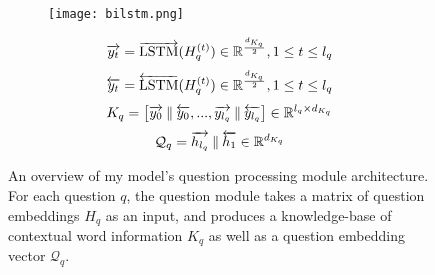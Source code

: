\begin{figure}[htbp]
    \centering
    \begin{subfigure}[l]{0.4\textwidth}
    \texttt{[image: bilstm.png]}
    \end{subfigure}
    \begin{subfigure}[r]{0.59\textwidth}
        \begin{equation}
            \overrightarrow{y_t} = \overrightarrow{\text{LSTM}}(H_q^{(t)}) \in \mathbb{R}^\frac{d_{K_q}}{2}, 1 \leq t \leq l_q\\
            \label{equation:question_module_forward_y_t}
        \end{equation}
        \begin{equation}
            \overleftarrow{y_t} = \overleftarrow{\text{LSTM}}(H_q^{(t)}) \in \mathbb{R}^\frac{d_{K_q}}{2}, 1 \leq t \leq l_q\\
            \label{equation:question_module_backward_y_t}
        \end{equation}
        \begin{equation}
            K_q = \left [ \overrightarrow{y_0} \mathbin\Vert \overleftarrow{y_0}, ..., \overrightarrow{y_{l_q}} \mathbin\Vert \overleftarrow{y_{l_q}}\right] \in \mathbb{R}^{l_q \times d_{K_q}}\\
            \label{equation:question_module_K_q}
        \end{equation}
        \begin{equation}
            \mathcal{Q}_q = \overrightarrow{h_{l_q}}\mathbin\Vert \overleftarrow{h_{1}} \in \mathbb{R}^{d_{K_q}}
            \label{equation:question_module_Q_q}
        \end{equation}
    \end{subfigure}
    \caption[An overview of my model's question processing module architecture.]{An overview of my model's question processing module architecture. For each question \(q\), the question module takes a matrix of question embeddings \(H_q\) as an input, and produces a knowledge-base of contextual word information \(K_q\) as well as a question embedding vector \(\mathcal{Q}_q\).}
    \label{fig:question_module_bilstm}
\end{figure}

